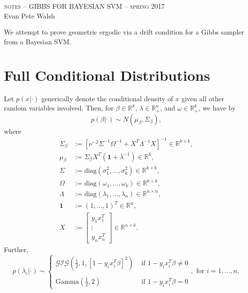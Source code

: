 \documentclass[12pt]{article}
\begin{document}
\thispagestyle{empty}
\begin{center}
  \Large \textsc{notes -- GIBBS FOR BAYESIAN SVM -- spring 2017} \\ 
  \vspace{5mm}
  \large Evan Pete Walsh
\end{center}

We attempt to prove geometric ergodic via a drift condition for a Gibbs sampler from a Bayesian SVM.

\section{Full Conditional Distributions}

Let $p(x|\cdot)$ generically denote the conditional density of $x$ given all other random variables involved. Then, for $\beta \in \mathbb{R}^{k}$,
$\lambda \in \mathbb{R}_{+}^{n}$, and $\omega \in \mathbb{R}_{+}^{k}$, we have by \cite{svm}
\[
  p(\beta|\cdot) \sim N(\mu_{\beta}, \Sigma_{\beta}),
\]
where 
\begin{align*}
  \Sigma_{\beta} & := [\nu^{-2}\Sigma^{-1}\Omega^{-1} + X^{T}\Lambda^{-1} X]^{-1} \in \mathbb{R}^{k\times k}, \\
  \mu_{\beta} & := \Sigma_{\beta}X^{T}(\bm{1} + \lambda^{-1}) \in \mathbb{R}^{k}, \\
  \Sigma & := \text{diag}(\sigma_1^2,\dots, \sigma_k^2) \in \mathbb{R}^{k\times k}, \\
  \Omega & := \text{diag}(\omega_1, \dots, \omega_k) \in \mathbb{R}^{k\times k}, \\
  \Lambda & := \text{diag}(\lambda_1, \dots, \lambda_n) \in \mathbb{R}^{n\times n}, \\
  \bm{1} & := (1, \dots, 1)^T \in \mathbb{R}^{n}, \\
  X & := \begin{bmatrix}
    y_1 x_1^T \\
    \vdots \\
    y_n x_n^T 
  \end{bmatrix} \in \mathbb{R}^{n\times k}.
\end{align*}
Further,
\[
  p(\lambda_i|\cdot) \sim \left\{ \begin{array}{cl}
      \mathcal{GIG}\left( \frac{1}{2}, 1, [1 - y_i x_i^T\beta]^2 \right) & \text{ if } 1-y_i x_i^T \beta \neq 0 \\ \\
      \text{Gamma}\left( \frac{1}{2}, 2 \right) & \text{ if } 1 - y_ix_i^T\beta = 0
  \end{array} \right., \text{ for } i=1,\dots, n,
\]
\end{document}

